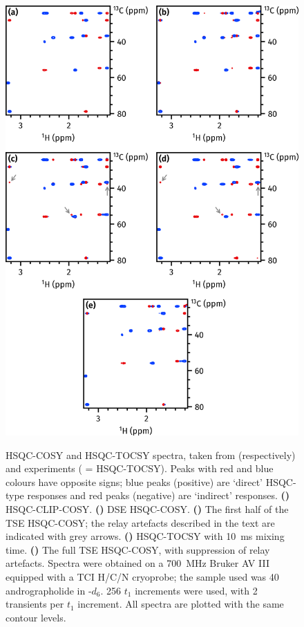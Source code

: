 \documentclass[a4paper,12pt]{article}
\newcommand{\andro}{Spectra were obtained on a \SI{700}{\MHz} Bruker AV III equipped with a TCI H/C/N cryoprobe; the sample used was \SI{40}{\milli\molar} andrographolide in \ch{DMSO}-$d_6$.}
\begin{document}
\begin{refsection}
\begin{figure}[!htp]
    \centering
    \includegraphics[]{hsqccosy_comp.png}%
    {\label{fig:hsqccosy_comp_clip}}%
    {\label{fig:hsqccosy_comp_dse}}%
    {\label{fig:hsqccosy_comp_tse_norps}}%
    {\label{fig:hsqccosy_comp_tocsy}}%
    {\label{fig:hsqccosy_comp_tse}}%
    \caption[Comparison of spectra acquired with different HSQC-COSY modules]{
        HSQC-COSY and HSQC-TOCSY spectra, taken from (respectively)  and  experiments ( = HSQC-TOCSY).
        Peaks with red and blue colours have opposite signs; blue peaks (positive) are `direct' HSQC-type responses and red peaks (negative) are `indirect' responses.
        \textbf{()} HSQC-CLIP-COSY.
        \textbf{()} DSE HSQC-COSY.
        \textbf{()} The first half of the TSE HSQC-COSY; the relay artefacts described in the text are indicated with grey arrows.
        \textbf{()} HSQC-TOCSY with \qty{10}{\ms} mixing time.
        \textbf{()} The full TSE HSQC-COSY, with suppression of relay artefacts.
        \andro{}
        256 $t_1$ increments were used, with 2 transients per $t_1$ increment.
        All spectra are plotted with the same contour levels.
    }
    \label{fig:hsqccosy_comp}
\end{figure}


\end{refsection}
\end{document}
